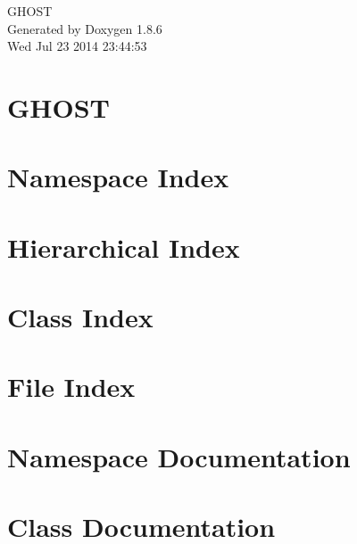 \documentclass[twoside]{book}
\newcommand{\clearemptydoublepage}{%
  \newpage{\pagestyle{empty}\cleardoublepage}%
}
\begin{document}
\hypersetup{pageanchor=false}
\begin{titlepage}
\vspace*{7cm}
\begin{center}%
{\Large G\-H\-O\-S\-T }\\
\vspace*{1cm}
{\large Generated by Doxygen 1.8.6}\\
\vspace*{0.5cm}
{\small Wed Jul 23 2014 23:44:53}\\
\end{center}
\end{titlepage}
\clearemptydoublepage
\tableofcontents
\clearemptydoublepage
{}
\hypersetup{pageanchor=true}

\chapter{G\-H\-O\-S\-T}
\label{index}\hypertarget{index}{}
\chapter{Namespace Index}

\chapter{Hierarchical Index}

\chapter{Class Index}

\chapter{File Index}

\chapter{Namespace Documentation}

\chapter{Class Documentation}



























\end{document}
